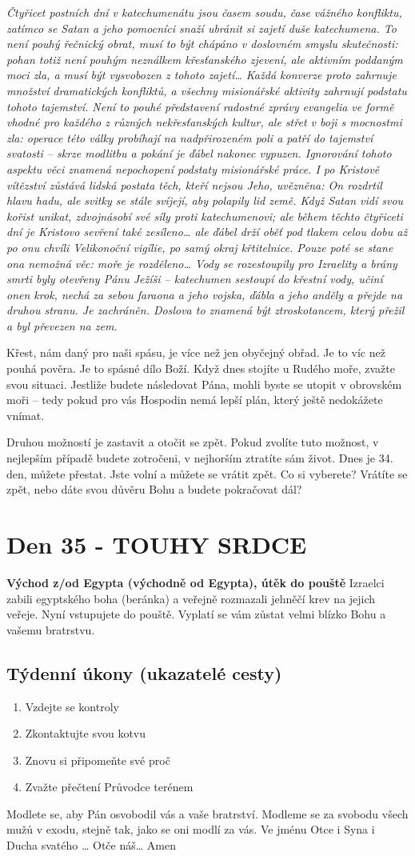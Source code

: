 \documentclass[11pt]{article}
\newcommand{\zacatekPatyTyden}{
  \textbf{Východ z/od Egypta (východně od Egypta), útěk do pouště} \newline
  Izraelci zabili egyptského boha (beránka) a veřejně rozmazali jehněčí krev na jejich veřeje. Nyní vstupujete
  do pouště. Vyplatí se vám zůstat velmi blízko Bohu a vašemu bratrstvu.

\subsection*{Týdenní úkony (ukazatelé cesty)}
\begin{enumerate}
  \item Vzdejte se kontroly
  \item Zkontaktujte svou kotvu
  \item Znovu si připomeňte své proč
  \item Zvažte přečtení Průvodce terénem
\end{enumerate}
Modlete se, aby Pán osvobodil vás a vaše bratrství. \newline
Modleme se za svobodu všech mužů v exodu, stejně tak, jako se oni modlí za vás.\newline
Ve jménu Otce i Syna i Ducha svatého …  Otče náš… Amen
}
\begin{document}
\textit{Čtyřicet postních dní v katechumenátu jsou časem soudu, čase vážného konfliktu, zatímco se
Satan a jeho pomocníci snaží ubránit si zajetí duše katechumena. To není pouhý řečnický obrat,
musí to být chápáno v doslovném smyslu skutečnosti: pohan totiž není pouhým neználkem
křesťanského zjevení, ale aktivním poddaným moci zla, a musí být vysvobozen z tohoto zajetí…
Každá konverze proto zahrnuje množství dramatických konfliktů, a všechny misionářské aktivity
zahrnují podstatu tohoto tajemství. Není to pouhé představení radostné zprávy evangelia ve
formě vhodné pro každého z různých nekřesťanských kultur, ale střet v boji s mocnostmi zla:
operace této války probíhají na nadpřirozeném poli a patří do tajemství svatosti – skrze modlitbu
a pokání je ďábel nakonec vypuzen. Ignorování tohoto aspektu věci znamená nepochopení
podstaty misionářské práce. I po Kristově vítězství zůstává lidská postata těch, kteří nejsou Jeho,
uvězněna: On rozdrtil hlavu hadu, ale svitky se stále svíjejí, aby polapily lid země. Když Satan
vidí svou kořist unikat, zdvojnásobí své síly proti katechumenovi; ale během těchto čtyřiceti dní je
Kristovo sevření také zesíleno… ale ďábel drží oběť pod tlakem celou dobu až po onu chvíli
Velikonoční vigílie, po samý okraj křtitelnice. Pouze poté se stane ona nemožná věc: moře je
rozděleno…
Vody se rozestoupily pro Izraelity a brány smrti byly otevřeny Pánu Ježíši – katechumen sestoupí
do křestní vody, učiní onen krok, nechá za sebou faraona a jeho vojska, ďábla a jeho anděly a
přejde na druhou stranu. Je zachráněn. Doslova to znamená být ztroskotancem, který přežil a byl
převezen na zem.}

Křest, nám daný pro naši spásu, je více než jen obyčejný obřad. Je to víc než pouhá pověra. Je to spásné dílo
Boží. Když dnes stojíte u Rudého moře, zvažte svou situaci. Jestliže budete následovat Pána, mohli byste se
utopit v obrovském moři – tedy pokud pro vás Hospodin nemá lepší plán, který ještě nedokážete vnímat.

Druhou možností je zastavit a otočit se zpět. Pokud zvolíte tuto možnost, v nejlepším případě budete
zotročeni, v nejhorším ztratíte sám život. Dnes je 34. den, můžete přestat. Jste volní a můžete se vrátit zpět.
Co si vyberete? Vrátíte se zpět, nebo dáte svou důvěru Bohu a budete pokračovat dál?

\newpage
\section{Den 35 - TOUHY SRDCE}
\zacatekPatyTyden
\end{document}
